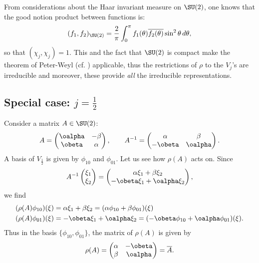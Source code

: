 From considerations about the Haar\quextproj{} invariant measure on $\SU(2)$, one knows that the good notion product between functions is:
\begin{equation}
(f_1,f_2)_{\SU(2)}=\frac{2}{\pi}\int_0^{\pi}f_1(\theta)\overline{ f_2(\theta) }\sin^2\theta\,d\theta,
\end{equation}
so that $(\chi_j,\chi_j)=1$. This and the fact that $\SU(2)$ is compact make the theorem of Peter-Weyl (cf. \cite{Sternberg}) applicable, thus the restrictions of $\rho$ to the $V_j$'s are irreducible and moreover, these provide \emph{all} the irreducible representations.

\subsection{Special case: \texorpdfstring{$j=\frac{1}{2}$}{j=1/2}}

Consider a matrix $A\in\SU(2)$:
\begin{equation}
A=\begin{pmatrix}
\oalpha & -\beta \\
\obeta & \alpha
\end{pmatrix},\qquad
A^{-1}=\begin{pmatrix}
\alpha & \beta \\
-\obeta & \oalpha
\end{pmatrix}.
\end{equation}
A basis of $V_{\frac{1}{2}}$ is given by $\phi_{10}$ and $\phi_{01}$. Let us see how $\rho(A)$ acts on. Since
\[
A^{-1}\begin{pmatrix}
\xi_1 \\
\xi_2
\end{pmatrix}=
\begin{pmatrix}
\alpha\xi_1+\beta\xi_2 \\
-\obeta\xi_1+\oalpha\xi_2
\end{pmatrix},
\]
we find
\begin{equation}
\begin{split}
  (\rho(A)\phi_{10})(\xi)&=\alpha\xi_1+\beta\xi_2=(\alpha\phi_{10}+\beta\phi_{01})(\xi)\\
  (\rho(A)\phi_{01})(\xi)&=-\obeta\xi_1+\oalpha\xi_2=(-\obeta\phi_{10}+\oalpha\phi_{01})(\xi).
\end{split}
\end{equation}
Thus in the basis $\{\phi_{10},\phi_{01}\}$, the matrix of $\rho(A)$ is given by
\begin{equation}
\rho(A)=\begin{pmatrix}
\alpha & -\obeta \\
\beta & \oalpha
\end{pmatrix}=\overline{A}.
\end{equation}

